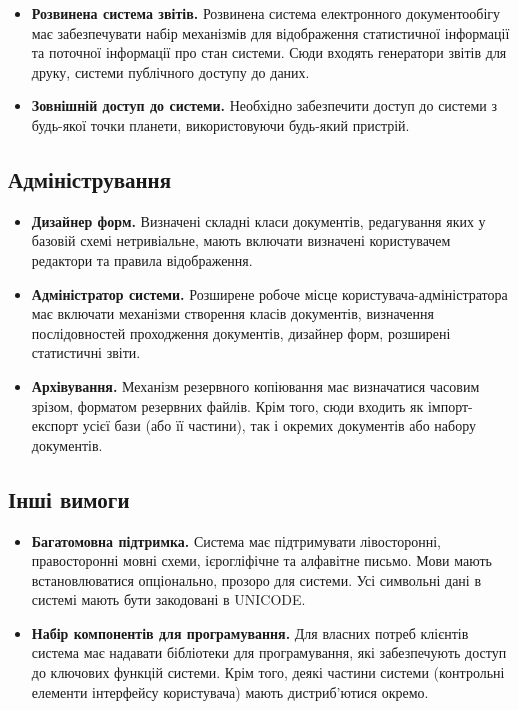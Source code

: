 \documentclass{memoir}
\begin{document}
\begin{itemize}
    \item \textbf{Розвинена система звітів.} Розвинена система електронного документообігу має забезпечувати набір механізмів для відображення статистичної інформації та поточної інформації про стан системи. Сюди входять генератори звітів для друку, системи публічного доступу до даних.
    \item \textbf{Зовнішній доступ до системи.} Необхідно забезпечити доступ до системи з будь-якої точки планети, використовуючи будь-який пристрій.
\end{itemize}

\subsection{Адміністрування}

\begin{itemize}
    \item \textbf{Дизайнер форм.} Визначені складні класи документів, редагування яких у базовій схемі нетривіальне, мають включати визначені користувачем редактори та правила відображення.
    \item \textbf{Адміністратор системи.} Розширене робоче місце користувача-адміністратора має включати механізми створення класів документів, визначення послідовностей проходження документів, дизайнер форм, розширені статистичні звіти.
    \item \textbf{Архівування.} Механізм резервного копіювання має визначатися часовим зрізом, форматом резервних файлів. Крім того, сюди входить як імпорт-експорт усієї бази (або її частини), так і окремих документів або набору документів.
\end{itemize}

\subsection{Інші вимоги}

\begin{itemize}
    \item \textbf{Багатомовна підтримка.} Система має підтримувати лівосторонні, правосторонні мовні схеми, ієрогліфічне та алфавітне письмо. Мови мають встановлюватися опціонально, прозоро для системи. Усі символьні дані в системі мають бути закодовані в UNICODE.
    \item \textbf{Набір компонентів для програмування.} Для власних потреб клієнтів система має надавати бібліотеки для програмування, які забезпечують доступ до ключових функцій системи. Крім того, деякі частини системи (контрольні елементи інтерфейсу користувача) мають дистриб’ютися окремо.
\end{itemize}
\end{document}
